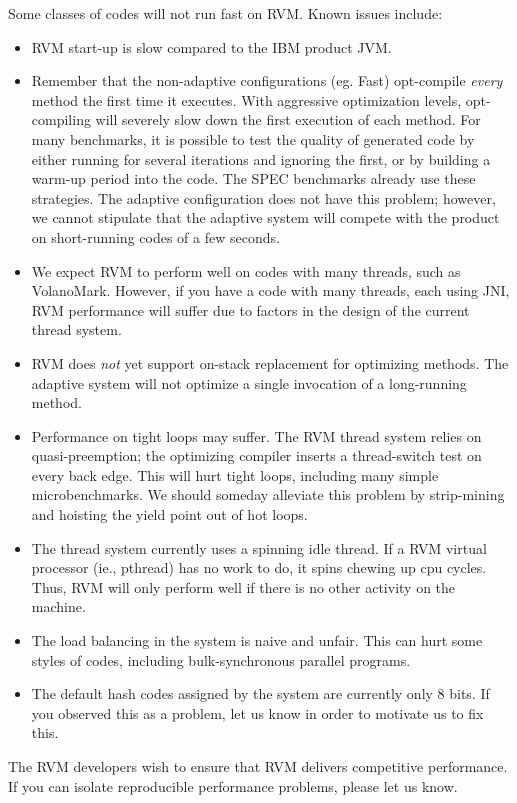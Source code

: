 Some classes of codes will not run fast on RVM.  Known issues include:
\begin{itemize}
\item RVM start-up is slow compared to the IBM product JVM.
\item Remember that the non-adaptive configurations (eg. Fast) opt-compile
{\em every} method the first time it executes.  With aggressive optimization
levels, opt-compiling will severely slow down the first execution of
each method.  For many benchmarks, it is possible to test the quality
of generated code by either running for several iterations and ignoring
the first, or by building a warm-up period into the code.  The SPEC benchmarks
already use these strategies.  The adaptive configuration does not
have this problem; however, we cannot stipulate that the adaptive
system will compete with the product on short-running codes of a few seconds.
\item We expect RVM to perform well on codes with many threads, such as
VolanoMark.  However, if you have a code with many threads, each using
JNI, RVM performance will suffer due to factors in the design of
the current thread system.
\item RVM does {\em not} yet support on-stack replacement for
optimizing methods.  The adaptive system will not optimize a single
invocation of a long-running 
method.
\item Performance on tight loops may suffer.  The RVM thread system
relies on quasi-preemption; the optimizing compiler inserts a thread-switch
test on every back edge.  This will hurt tight loops, including many
simple microbenchmarks.  We should someday alleviate this problem by
strip-mining and hoisting the yield point out of hot loops.
\item The thread system currently uses a spinning idle thread. If a RVM
virtual processor (ie., pthread) has no work to do, it spins chewing up
cpu cycles.  Thus, RVM will only perform well if there is no other activity on the machine.
\item The load balancing in the system is naive and unfair.  This can hurt some styles of codes, including bulk-synchronous parallel programs.
\item The default hash codes assigned by the system are currently only 8
bits.  If you observed this as a problem, let us know in order to motivate
us to fix this.
\end{itemize}

The RVM developers wish to ensure that RVM delivers competitive performance.
If you can isolate reproducible performance problems, please let us
know. 
